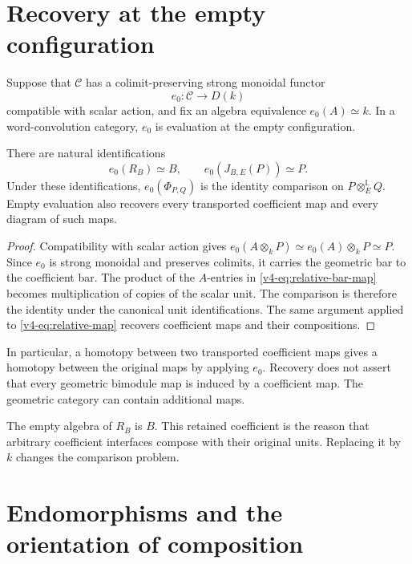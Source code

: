 \section{Recovery at the empty configuration}
\label{v4-sec:relative-empty-recovery}

Suppose that \(\mathcal C\) has a colimit-preserving strong
monoidal functor
\[
 e_0:\mathcal C\longrightarrow D(k)
\]
compatible with scalar action, and fix an algebra
equivalence \(e_0(A)\simeq k\). In a word-convolution
category, \(e_0\) is evaluation at the empty configuration.

\begin{proposition}\label{v4-prop:relative-retraction}
There are natural identifications
\[
 e_0(R_B)\simeq B,\qquad e_0(J_{B,E}(P))\simeq P.
\]
Under these identifications,
\(e_0(\Phi_{P,Q})\) is the identity comparison on
\(P\otimes_E^{\mathbb L}Q\).
Empty evaluation also recovers every transported coefficient
map and every diagram of such maps.
\end{proposition}

\begin{proof}
Compatibility with scalar action gives
\(e_0(A\otimes_kP)\simeq e_0(A)\otimes_kP\simeq P\).
Since \(e_0\) is strong monoidal and preserves colimits,
it carries the geometric bar to the coefficient bar.
The product of the \(A\)-entries in
\eqref{v4-eq:relative-bar-map} becomes multiplication of
copies of the scalar unit. The comparison is therefore
the identity under the canonical unit identifications.
The same argument applied to
\eqref{v4-eq:relative-map} recovers coefficient maps and
their compositions.
\end{proof}

In particular, a homotopy between two transported coefficient
maps gives a homotopy between the original maps by applying
\(e_0\). Recovery does
not assert that every geometric bimodule map is induced
by a coefficient map. The geometric category can contain
additional maps.

The empty algebra of \(R_B\) is \(B\). This retained
coefficient is the reason that arbitrary coefficient
interfaces compose with their original units. Replacing
it by \(k\) changes the comparison problem.

\section{Endomorphisms and the orientation of composition}
\label{v4-sec:endomorphism-interfaces}

